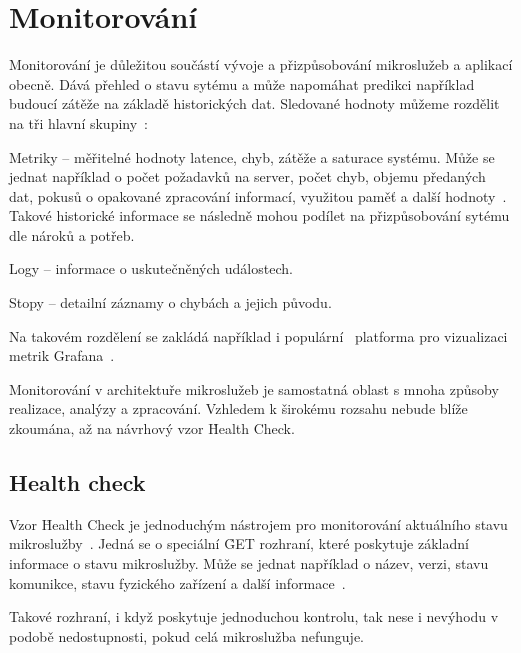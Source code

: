 \section{Monitorování}\label{sec:msa-monitoring}

Monitorování je důležitou součástí vývoje a přizpůsobování mikroslužeb a aplikací obecně.
Dává přehled o stavu sytému a může napomáhat predikci například budoucí zátěže na základě historických dat.
Sledované hodnoty můžeme rozdělit na tři hlavní skupiny~\cite{msactions}:

\begin{dl}
   \item [Metriky] – měřitelné hodnoty latence, chyb, zátěže a saturace systému.
   Může se jednat například o počet požadavků na server, počet chyb, objemu předaných dat, pokusů o opakované zpracování informací, využitou paměť a další hodnoty~\cite{msactions}.
   Takové historické informace se následně mohou podílet na přizpůsobování sytému dle nároků a potřeb.
   \item [Logy] – informace o uskutečněných událostech.
   \item [Stopy] – detailní záznamy o chybách a jejich původu.
\end{dl}

Na takovém rozdělení se zakládá například i populární~\cite{grafanapop} platforma pro vizualizaci metrik Grafana~\cite{grafana}.

Monitorování v architektuře mikroslužeb je samostatná oblast s mnoha způsoby realizace, analýzy a zpracování.
Vzhledem k širokému rozsahu nebude blíže zkoumána, až na návrhový vzor \h{Health Check}.


\subsection{Health check}\label{subsec:msa-monitoring-healthcheck}

Vzor \h{Health Check} je jednoduchým nástrojem pro monitorování aktuálního stavu mikroslužby~\cite{healthcheck}.
Jedná se o speciální  \h{GET} rozhraní, které poskytuje základní informace o stavu mikroslužby.
Může se jednat například o název, verzi, stavu komunikce, stavu fyzického zařízení a další informace~\cite{healthcheck}.

Takové rozhraní, i když poskytuje jednoduchou kontrolu, tak nese i nevýhodu v podobě nedostupnosti, pokud celá mikroslužba nefunguje.
